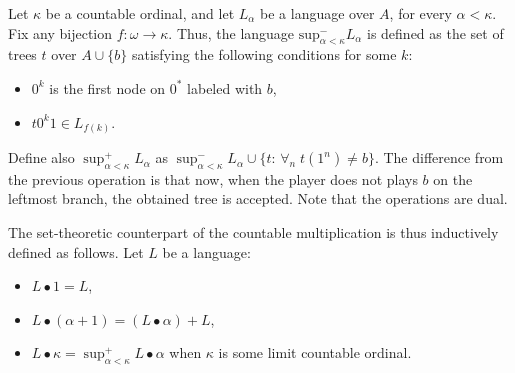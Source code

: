 Let $\kappa$ be a countable ordinal, and let  $L_\alpha$ be a language over $A$,
for every $\alpha < \kappa$. Fix any bijection $f: \omega \to \kappa$. Thus, the language $\mathrm{sup}^-_{\alpha<\kappa} L_\alpha$ is defined as the set of trees $t$ over $A\cup\{b\}$ satisfying the following conditions for some $k$:
\begin{itemize}
\item $0^k$ is the first node on $0^*$ labeled with $b$,
\item $t0^k1 \in L_{f(k)}$.
\end{itemize}

Define also
$\sup^+ _{\alpha < \kappa} L_\alpha$ as $\sup^-_{\alpha < \kappa} L_\alpha\cup \{t :\, \forall_n\; t(1^n)\neq b\}$.
The difference from the previous operation is that now, when the
player does not plays $b$ on the leftmost branch, the obtained tree is
accepted. Note that the operations are dual. 
%





The set-theoretic counterpart of the countable multiplication is thus  inductively defined as follows. 
Let $L$ be a language: 
\begin{itemize}
\item $L \bullet 1 = L$, 
\item $L \bullet (\alpha + 1) = (L \bullet \alpha)+L$, 
\item $L \bullet \kappa = \sup^+_{\alpha < \kappa} L \bullet \alpha$ when $\kappa$  is some limit countable ordinal.
\end{itemize}

